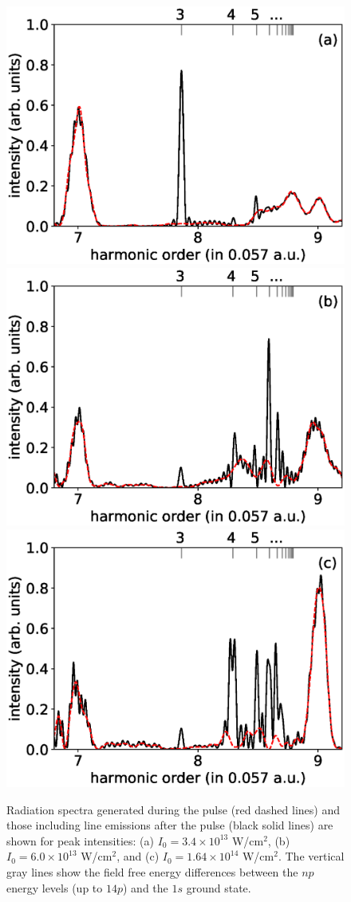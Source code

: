 \begin{figure}[h!]
\centering
\includegraphics[width=0.75\columnwidth]{figs/Rydberg/HHG_3p4e13.eps}
\includegraphics[width=0.75\columnwidth]{figs/Rydberg/HHG_6p0e13.eps}
\includegraphics[width=0.75\columnwidth]{figs/Rydberg/HHG_16p4e13.eps}
\caption{Radiation spectra generated during the pulse (red dashed lines) and those including line emissions after the pulse (black solid lines) are shown for peak intensities:
(a) $I_0 = 3.4\times10^{13}$ W/cm$^2$, 
(b) $I_0 = 6.0\times10^{13}$ W/cm$^2$, and
(c) $I_0 = 1.64\times10^{14}$ W/cm$^2$.
The vertical gray lines show the field free energy differences between the $np$ energy levels (up to $14p$) and the $1s$ ground state. 
}
\label{fig:HHG_6_10}
\end{figure}

